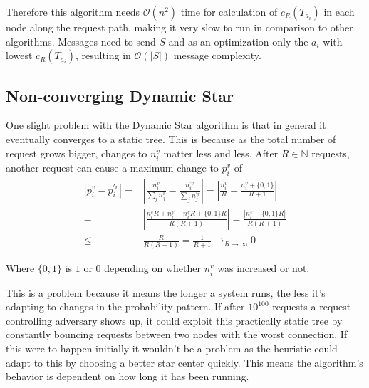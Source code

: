 \documentclass[a4paper, oneside]{discothesis}
\begin{document}
Therefore this algorithm needs $\mathcal{O}(n^2)$ time for calculation of $c_R(T_{a_i})$ in each node along the request path, making it very slow to run in comparison to other algorithms. Messages need to send $S$ and as an optimization only the $a_{i}$ with lowest $c_R(T_{a_{i}})$, resulting in $\mathcal{O}(|S|)$ message complexity.

\subsection{Non-converging Dynamic Star}

One slight problem with the Dynamic Star algorithm is that in general it eventually converges to a static tree. This is because as the total number of request grows bigger, changes to $n_i^v$ matter less and less. After $R\in\mathbb{N}$ requests, another request can cause a maximum change to $p_i^v$ of
\begin{equation}
\begin{split}
\left|p_i^v-p_i^{'v}\right| = & \left|\frac{n_i^v}{\sum_jn_j^v}-\frac{n_i^{'v}}{\sum_jn_j^{'v}}\right| = \left|\frac{n_i^v}{R}-\frac{n_i^v+\{0,1\}}{R+1}\right| \\
= & \left|\frac{n_i^vR+n_i^v-n_i^vR+\{0,1\}R}{R(R+1)}\right| = \frac{\left|n_i^v-\{0,1\}R\right|}{R(R+1)} \\
\leq & \frac{R}{R(R+1)}=\frac{1}{R+1}\to_{R\to\infty} 0
\end{split}
\end{equation}

Where $\{0,1\}$ is $1$ or $0$ depending on whether $n_i^v$ was increased or not.

This is a problem because it means the longer a system runs, the less it's adapting to changes in the probability pattern. If after $10^{100}$ requests a request-controlling adversary shows up, it could exploit this practically static tree by constantly bouncing requests between two nodes with the worst connection. If this were to happen initially it wouldn't be a problem as the heuristic could adapt to this by choosing a better star center quickly. This means the algorithm's behavior is dependent on how long it has been running.
\end{document}

